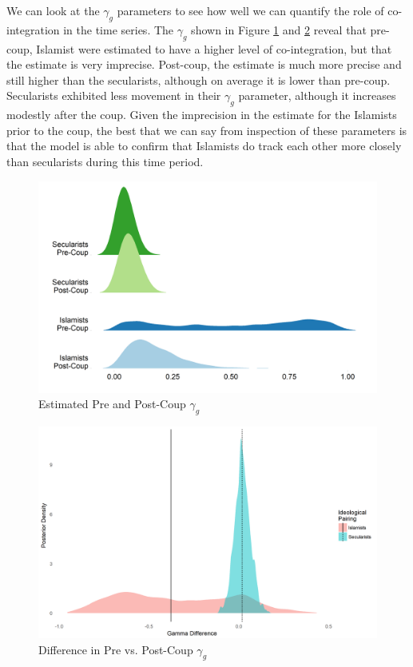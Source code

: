 \documentclass[12pt]{article}
\begin{document}
We can look at the $\gamma_g$ parameters to see how well we can quantify the role of co-integration in the time series. The $\gamma_g$ shown in Figure \ref{gamma_joy} and \ref{gamma_diff} reveal that pre-coup, Islamist were estimated to have a higher level of co-integration, but that the estimate is very imprecise. Post-coup, the estimate is much more precise and still higher than the secularists, although on average it is lower than pre-coup. Secularists exhibited less movement in their $\gamma_g$ parameter, although it increases modestly after the coup. Given the imprecision in the estimate for the Islamists prior to the coup, the best that we can say from inspection of these parameters is that the model is able to confirm that Islamists do track each other more closely than secularists during this time period.
 \begin{figure}[!h]
	\centering
	\caption{Estimated Pre and Post-Coup $\gamma_g$}\label{gamma_joy}
	\centering
	\includegraphics[width=.9\linewidth]{gamma_joy}
\end{figure}
\begin{figure}[!h]
	\centering
	\caption{Difference in Pre vs. Post-Coup $\gamma_g$}\label{gamma_diff}
	\centering
	\includegraphics[width=.9\linewidth]{gamma_diff}
\end{figure}
\end{document}
